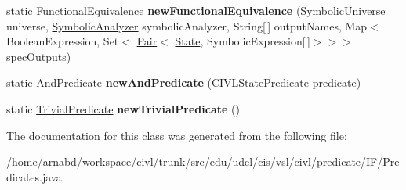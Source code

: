 \begin{DoxyCompactItemize}
\item 
\hypertarget{classedu_1_1udel_1_1cis_1_1vsl_1_1civl_1_1predicate_1_1IF_1_1Predicates_ad2243bbbbd59374a740428d4788c9e83}{}static \hyperlink{interfaceedu_1_1udel_1_1cis_1_1vsl_1_1civl_1_1predicate_1_1IF_1_1FunctionalEquivalence}{Functional\+Equivalence} {\bfseries new\+Functional\+Equivalence} (Symbolic\+Universe universe, \hyperlink{interfaceedu_1_1udel_1_1cis_1_1vsl_1_1civl_1_1semantics_1_1IF_1_1SymbolicAnalyzer}{Symbolic\+Analyzer} symbolic\+Analyzer, String\mbox{[}$\,$\mbox{]} output\+Names, Map$<$ Boolean\+Expression, Set$<$ \hyperlink{classedu_1_1udel_1_1cis_1_1vsl_1_1civl_1_1util_1_1IF_1_1Pair}{Pair}$<$ \hyperlink{interfaceedu_1_1udel_1_1cis_1_1vsl_1_1civl_1_1state_1_1IF_1_1State}{State}, Symbolic\+Expression\mbox{[}$\,$\mbox{]}$>$$>$$>$ spec\+Outputs)\label{classedu_1_1udel_1_1cis_1_1vsl_1_1civl_1_1predicate_1_1IF_1_1Predicates_ad2243bbbbd59374a740428d4788c9e83}

\item 
\hypertarget{classedu_1_1udel_1_1cis_1_1vsl_1_1civl_1_1predicate_1_1IF_1_1Predicates_a1e7ff6c5309795c21174511b4feae7a4}{}static \hyperlink{interfaceedu_1_1udel_1_1cis_1_1vsl_1_1civl_1_1predicate_1_1IF_1_1AndPredicate}{And\+Predicate} {\bfseries new\+And\+Predicate} (\hyperlink{interfaceedu_1_1udel_1_1cis_1_1vsl_1_1civl_1_1predicate_1_1IF_1_1CIVLStatePredicate}{C\+I\+V\+L\+State\+Predicate} predicate)\label{classedu_1_1udel_1_1cis_1_1vsl_1_1civl_1_1predicate_1_1IF_1_1Predicates_a1e7ff6c5309795c21174511b4feae7a4}

\item 
\hypertarget{classedu_1_1udel_1_1cis_1_1vsl_1_1civl_1_1predicate_1_1IF_1_1Predicates_afb1d4ec3a152488aa3f82488c53141ea}{}static \hyperlink{interfaceedu_1_1udel_1_1cis_1_1vsl_1_1civl_1_1predicate_1_1IF_1_1TrivialPredicate}{Trivial\+Predicate} {\bfseries new\+Trivial\+Predicate} ()\label{classedu_1_1udel_1_1cis_1_1vsl_1_1civl_1_1predicate_1_1IF_1_1Predicates_afb1d4ec3a152488aa3f82488c53141ea}

\end{DoxyCompactItemize}


The documentation for this class was generated from the following file\+:\begin{DoxyCompactItemize}
\item 
/home/arnabd/workspace/civl/trunk/src/edu/udel/cis/vsl/civl/predicate/\+I\+F/Predicates.\+java\end{DoxyCompactItemize}
